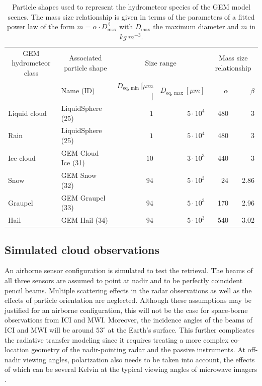\documentclass[journal abbreviation, manuscript]{copernicus}
\begin{document}
\begin{table}
  \centering
  \caption{Particle shapes used to represent the hydrometeor species of the
  GEM model scenes. The mass size relationship is given in terms of the parameters
    of a fitted power law of the form $m = \alpha \cdot D_\text{max}^\beta$ with
    $D_\text{max}$ the maximum diameter and $m$ in $\unit{kg\ m^{-3}}$.}
  \begin{tabular}{l|l|rr|rr}
    \multicolumn{1}{c|}{GEM hydrometeor class} & \multicolumn{1}{c|}{Associated particle shape}  & \multicolumn{2}{c|}{Size range} & \multicolumn{2}{c}{Mass size relationship} \\
    & Name (ID) &$D_{\text{eq}, \text{ min}}\ [\unit{\mu m}$] & $D_{\text{eq}, \text{ max}}\ [\unit{\mu m}]$ &\hfill $\alpha $ & \hfill $\beta$ \\
    \hline
    Liquid cloud & LiquidSphere (25) & $1$ & $5\cdot10^{4}$ & 480 & 3 \\
    Rain         & LiquidSphere (25) & $1$ & $5\cdot10^{4}$ & 480 & 3 \\
    Ice cloud    & GEM Cloud Ice (31) & $10$  & $3\cdot 10^3$    &  440 & 3 \\
    Snow    & GEM Snow (32) & $94$  & $5\cdot 10^3$    &  24 & 2.86 \\
    Graupel    & GEM Graupel (33) & $94$  & $5\cdot 10^3$    &  170 & 2.96 \\
    Hail     & GEM Hail (34) & $94$  & $5\cdot 10^3$    &  540 & 3.02 \\
  \end{tabular}
  \label{tab:gem_particle_properties}
\end{table}

\subsection{Simulated cloud observations}

An airborne sensor configuration is simulated to test the retrieval. The beams
of all three sensors are assumed to point at nadir and to be perfectly
coincident pencil beams. Multiple scattering effects in the radar observations
as well as the effects of particle orientation are neglected. Although these
assumptions may be justified for an airborne configuration, this will not be the
case for space-borne observations from ICI and MWI. Moreover, the incidence
angles of the beams of ICI and MWI will be around $53^\circ$ at the Earth's
surface. This further complicates the radiative transfer modeling since it
requires treating a more complex co-location geometry of the nadir-pointing
radar and the passive instruments. At off-nadir viewing angles, polarization
also needs to be taken into account, the effects of which can be several Kelvin
at the typical viewing angles of microwave imagers \citep{xie15}.
\end{document}
